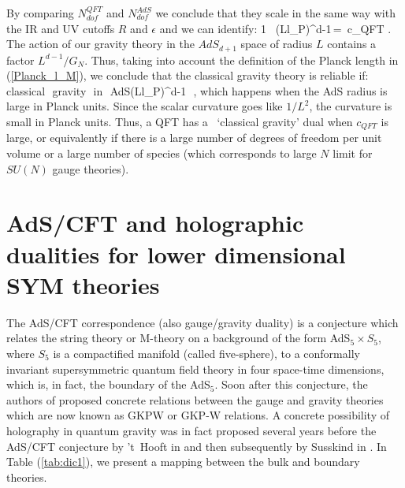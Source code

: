 By comparing $N_{dof}^{QFT}$ and $N_{dof}^{AdS}$  we conclude that they scale in the same way with the IR and UV cutoffs  $R$ and $\epsilon$ and we can identify:
\beq
{1}\,\,\, \Big({L\over l_P}\Big)^{d-1}\,=\,  c_{QFT}\,\,.
\label{holo_centralCharge}
 \eeq
The action of our gravity theory in the $AdS_{d+1}$ space of radius $L$ contains a factor $ L^{d-1}/G_N$. 
Thus, taking into account the definition of the Planck length in (\ref{Planck_l_M}), we conclude that the classical  gravity theory is reliable if:
\beq
{\rm classical\,\, gravity\,\, in\,\, AdS}\to \Big({L\over l_P}\Big)^{d-1} \,\,,
\eeq
which happens when the AdS radius is large in Planck units. Since the scalar curvature 
goes like $1/L^2$, the curvature
is small in Planck units. Thus, a QFT has a ~`classical gravity' dual when $c_{QFT}$ is 
large, or equivalently if there is a large number of degrees of freedom per unit volume or a large number 
of species (which corresponds to large $N$ limit for $SU(N)$ gauge theories). 

\section{\label{sec-ads}AdS/CFT and holographic dualities for lower 
dimensional SYM theories}

The AdS/CFT correspondence (also gauge/gravity duality) is a conjecture which relates
the string theory or M-theory on a background of the form 
AdS$_{5} \times S_{5} $, where $S_{5}$ is a compactified manifold 
(called five-sphere), to a 
conformally invariant supersymmetric quantum field theory 
in four space-time dimensions, which is, in fact, the boundary 
of the AdS$_{5}$. Soon after this conjecture, the authors of 
\cite{Gubser:1998bc,Witten:1998qj} proposed concrete relations 
between the gauge and gravity theories which are now known as 
GKPW or GKP-W relations. 
A concrete possibility of holography in quantum gravity was in 
fact proposed several years before the 
AdS/CFT conjecture by 't~Hooft in \cite{tHooft:1993dmi} and then 
subsequently by Susskind 
in \cite{Susskind:1994vu}. In Table (\ref{tab:dic1}), 
we present a mapping between the bulk and boundary
theories. 

\vspace{4mm} 

